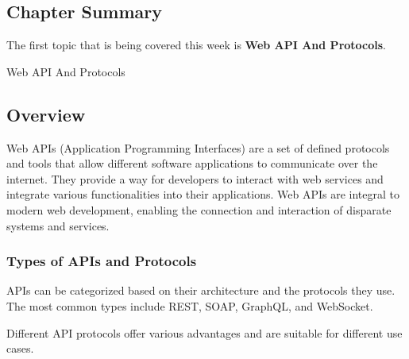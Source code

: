 \newpage

\subsection{Chapter Summary}

The first topic that is being covered this week is \textbf{Web API And Protocols}.

\begin{notes}{Web API And Protocols}
    \subsection*{Overview}

    Web APIs (Application Programming Interfaces) are a set of defined protocols and tools that allow different software applications to communicate over the internet. They provide a way for developers 
    to interact with web services and integrate various functionalities into their applications. Web APIs are integral to modern web development, enabling the connection and interaction of disparate 
    systems and services.
    
    \subsubsection*{Types of APIs and Protocols}
    
    APIs can be categorized based on their architecture and the protocols they use. The most common types include REST, SOAP, GraphQL, and WebSocket.
    
    \begin{highlight}
    
        Different API protocols offer various advantages and are suitable for different use cases.
        

\end{highlight}
\end{notes}
